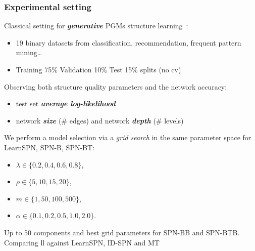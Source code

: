 \documentclass[xcolor={usenames,dvipsnames,svgnames}, compress]{beamer}
\begin{document}
\begin{frame}[t]
  \frametitle{Experimental setting}
  \footnotesize
  Classical setting for \emph{\textbf{generative}} PGMs
  structure learning~\parencite{Gens2013}:
  \begin{itemize}
    \item 19 binary datasets from classification, recommendation,
    frequent pattern mining\dots \parencite{Lowd2010} \parencite{Haaren2012}
  \item Training 75\% Validation 10\% Test 15\%  splits (no cv)
  \end{itemize}

  Observing both structure quality parameters and the network
  accuracy:
  \begin{itemize}
   \item test set \emph{\textbf{average log-likelihood}}
   \item network \textbf{\emph{size}} (\# edges) and network \textbf{\emph{depth}} (\# levels)
  \end{itemize}
   
  We perform a model selection via a \textit{grid search} in the same parameter
  space for \textsf{LearnSPN}, \textsf{SPN-B}, \textsf{SPN-BT}:\\[-3pt]
  
    \begin{minipage}[t]{0.35\linewidth}
      \begin{itemize}
      \item \scriptsize$\lambda \in \{0.2, 0.4, 0.6, 0.8\}$,
      \item \scriptsize$\rho \in \{5, 10, 15, 20\}$, 
      \end{itemize}
    \end{minipage}\begin{minipage}[t]{0.5\linewidth}
      \begin{itemize}
      \item \scriptsize$m \in \{1, 50, 100, 500\}$, 
      \item \scriptsize$\alpha \in \{ 0.1, 0.2, 0.5, 1.0, 2.0\}$.
      \end{itemize}
    \end{minipage}

    Up to 50 components and best grid parameters for \textsf{SPN-BB} and \textsf{SPN-BTB}.
    Comparing ll against \textsf{LearnSPN},
    \textsf{ID-SPN} and \textsf{MT}~\parencite{Meila2000}

  \end{frame}
\end{document}
